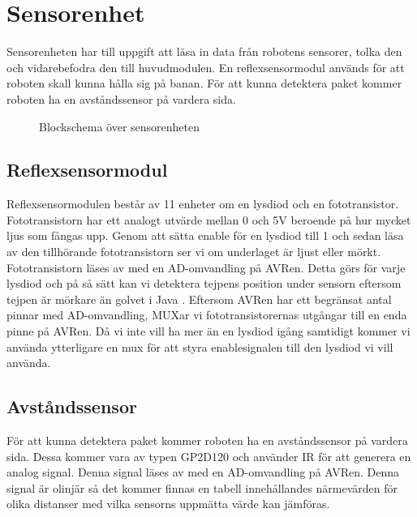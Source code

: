 %

\section{Sensorenhet}
Sensorenheten har till uppgift att läsa in data från robotens sensorer, tolka den och vidarebefodra den till huvudmodulen. En reflexsensormodul används för att roboten skall kunna hålla sig på banan. För att kunna detektera paket kommer roboten ha en avståndssensor på vardera sida. \\

\begin{figure}[h]
\center

\caption{Blockschema över sensorenheten}
\end{figure}

\subsection{Reflexsensormodul}
Reflexsensormodulen består av 11 enheter om en lysdiod och en fototransistor. Fototransistorn har ett analogt utvärde mellan 0 och 5V beroende på hur mycket ljus som fångas upp. Genom att sätta enable för en lysdiod till 1 och sedan läsa av den tillhörande fototransistorn ser vi om underlaget är ljust eller mörkt. Fototransistorn läses av med en AD-omvandling på AVRen. Detta görs för varje lysdiod och på så sätt kan vi detektera tejpens position under sensorn eftersom tejpen är mörkare än golvet i Java . Eftersom AVRen har ett begränsat antal pinnar med AD-omvandling, MUXar vi fototransistorernas utgångar till en enda pinne på AVRen. Då vi inte vill ha mer än en lysdiod igång samtidigt kommer vi använda ytterligare en mux för att styra enablesignalen till den lysdiod vi vill använda.

\subsection{Avståndssensor}
För att kunna detektera paket kommer roboten ha en avståndssensor på vardera sida. Dessa kommer vara av typen GP2D120 och använder IR för att generera en analog signal. Denna signal läses av med en AD-omvandling på AVRen. Denna signal är olinjär så det kommer finnas en tabell innehållandes närmevärden för olika distanser med vilka sensorns uppmätta värde kan jämföras.

